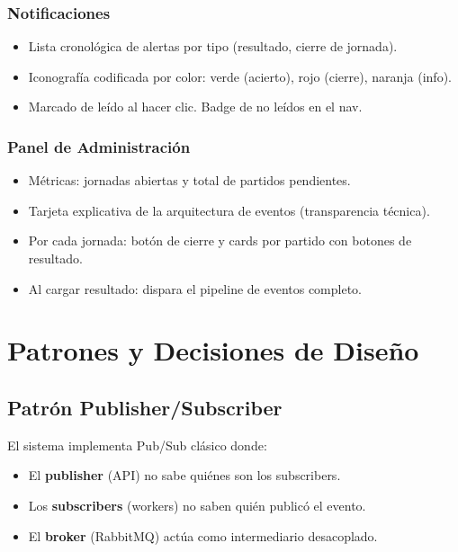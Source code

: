 \documentclass[12pt,a4paper]{article}
\begin{document}
\subsubsection{Notificaciones}
\begin{itemize}
  \item Lista cronológica de alertas por tipo (resultado, cierre de jornada).
  \item Iconografía codificada por color: verde (acierto), rojo (cierre), naranja (info).
  \item Marcado de leído al hacer clic. Badge de no leídos en el nav.
\end{itemize}

\subsubsection{Panel de Administración}
\begin{itemize}
  \item Métricas: jornadas abiertas y total de partidos pendientes.
  \item Tarjeta explicativa de la arquitectura de eventos (transparencia técnica).
  \item Por cada jornada: botón de cierre y cards por partido con botones de resultado.
  \item Al cargar resultado: dispara el pipeline de eventos completo.
\end{itemize}

\section{Patrones y Decisiones de Diseño}

\subsection{Patrón Publisher/Subscriber}

El sistema implementa Pub/Sub clásico donde:
\begin{itemize}
  \item El \textbf{publisher} (API) no sabe quiénes son los subscribers.
  \item Los \textbf{subscribers} (workers) no saben quién publicó el evento.
  \item El \textbf{broker} (RabbitMQ) actúa como intermediario desacoplado.
\end{itemize}
\end{document}
